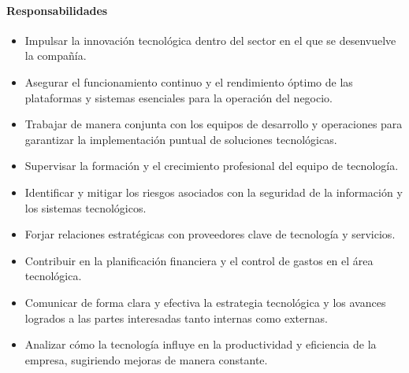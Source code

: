     \paragraph{Responsabilidades }
        \begin{itemize}
            \item Impulsar la innovación tecnológica dentro del sector en el que se desenvuelve la compañía. 
            \item Asegurar el funcionamiento continuo y el rendimiento óptimo de las plataformas y sistemas esenciales para la operación del negocio. 
            \item Trabajar de manera conjunta con los equipos de desarrollo y operaciones para garantizar la implementación puntual de soluciones tecnológicas. 
            \item Supervisar la formación y el crecimiento profesional del equipo de tecnología. 
            \item Identificar y mitigar los riesgos asociados con la seguridad de la información y los sistemas tecnológicos. 
            \item Forjar relaciones estratégicas con proveedores clave de tecnología y servicios. 
            \item Contribuir en la planificación financiera y el control de gastos en el área tecnológica. 
            \item Comunicar de forma clara y efectiva la estrategia tecnológica y los avances logrados a las partes interesadas tanto internas como externas. 
            \item Analizar cómo la tecnología influye en la productividad y eficiencia de la empresa, sugiriendo mejoras de manera constante. 
        \end{itemize}


